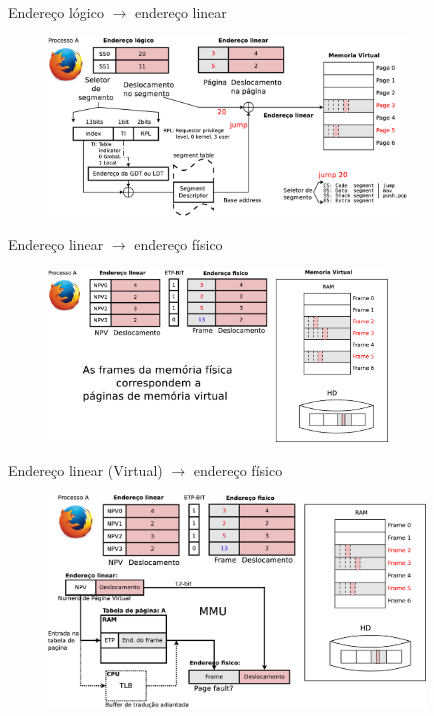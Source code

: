 \documentclass[envcountsect,dvips]{beamer}
\begin{document}
\begin{frame}{Endereço lógico $\rightarrow$ endereço linear}
\begin{figure}
\centering
\includegraphics[width=9.5cm]{images/segmento2.eps}
\label{fig:pagina}
\end{figure}
\end{frame}

\begin{frame}{Endereço linear $\rightarrow$ endereço físico}
\begin{figure}
\centering
\includegraphics[width=9cm]{images/pagina.eps}
\label{fig:pagina}
\end{figure}
\end{frame}

\begin{frame}{Endereço linear (Virtual) $\rightarrow$ endereço físico}
\begin{figure}
\centering
\includegraphics[width=10cm]{images/pagina2.eps}
\label{fig:pagina2}
\end{figure}
\end{frame}
\end{document}
